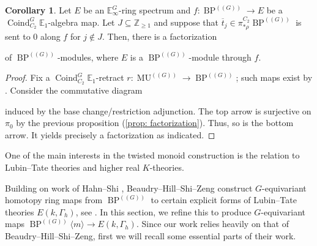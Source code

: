 \documentclass[a4paper, 10pt]{article}
\newcommand{\E}{\mathbb E}  %
\newcommand{\Z}{\mathbb{Z}}
\newcommand{\MU}{\operatorname{MU}}
\newcommand{\MUG}{{\MU^{(\!(G)\!)}}}
\newcommand{\BPG}{{\BP^{(\!(G)\!)}}}
\newcommand{\BPGm}{{\BP^{(\!(G)\!)}}\langle m\rangle}
\newcommand{\LMod}{\mathrm{LMod}}
\newcommand{\BP}{\operatorname{BP}}
\newcommand{\Map}{\operatorname{Map}}
\newcommand{\Coind}{\operatorname{Coind}}
\newcommand{\ol}{\overline}
\theoremstyle{definition}
\newtheorem{corollary}[corollary]{Corollary}
\begin{document}
\begin{corollary}
    \label{corollary: factoring BPG to E}
    Let $E$ be an $\E_{\infty}^G$-ring spectrum and $f \colon \BPG \to E$ be a $\Coind_{C_2}^G \E_{1}$-algebra map. Let $J \subseteq \Z_{\geq 1}$ and suppose that $\ol{t}_j \in \pi_{*\rho}^{C_2} \BPG$ is sent to $0$ along $f$ for $j \not \in J$. Then, there is a factorization
    \begin{center}
    \end{center}
    of $\BPG$-modules, where $E$ is a $\BPG$-module through $f$.
\end{corollary}

\begin{proof}
    Fix a $\Coind_{C_2}^G \E_1$-retract $r \colon \MUG \to \BPG$; such maps exist by \cite[Theorem 6.3.1]{quinnZhu2026multiplicativeequivariantthomspectra}. Consider the commutative diagram
    \begin{center}
    \end{center}
    induced by the base change/restriction adjunction. The top arrow is surjective on $\pi_0$ by the previous proposition (\cref{prop: factorization}). Thus, so is the bottom arrow. It yields precisely a factorization as indicated.
\end{proof}

One of the main interests in the twisted monoid construction is the relation to Lubin--Tate theories and higher real \(K\)-theories.

Building on work of Hahn--Shi \cite{hahnRealOrientationsLubin2020}, 
Beaudry--Hill--Shi--Zeng construct \(G\)-equivariant homotopy ring maps from \(\BPG\) to certain explicit forms of Lubin--Tate theories \(E(k,\Gamma_h)\), see \cite{beaudryHillShiZeng2021modelsLubinTate}.
In this section, we refine this to produce \(G\)-equivariant maps \(\BPGm\to E(k,\Gamma_h)\). Since our work relies heavily on that of Beaudry--Hill--Shi--Zeng, first we will recall some essential parts of their work.
\end{document}
